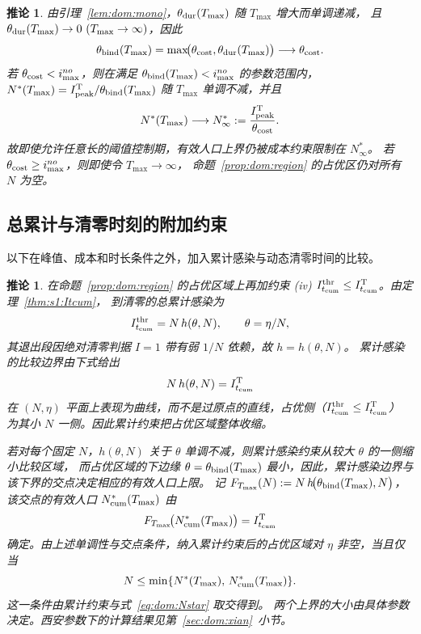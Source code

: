 \documentclass[lang=cn,a4paper,newtx]{elegantpaper}
\numberwithin{equation}{section}
\theoremstyle{plain}
\newtheorem{corollaryn}[theorem]{推论}
\newcommand{\Itcum}{I_{t_{\mathrm{cum}}}}
\begin{document}
\begin{corollaryn}\label{cor:ceiling}
由引理~\ref{lem:dom:mono}，$\theta_{\rm dur}(T_{\max})$ 随 $T_{\max}$ 增大而单调递减，
且 $\theta_{\rm dur}(T_{\max})\to0\ (T_{\max}\to\infty)$，因此
\[
  \theta_{\rm bind}(T_{\max})
  =
  \max\!\bigl(
    \theta_{\rm cost},
    \theta_{\rm dur}(T_{\max})
  \bigr)
  \longrightarrow
  \theta_{\rm cost}.
\]
若 $\theta_{\rm cost}<i_{\max}^{no}$，则在满足 $\theta_{\rm bind}(T_{\max})<i_{\max}^{no}$
的参数范围内，$N^\ast(T_{\max})=I_{\rm peak}^{\rm T}/\theta_{\rm bind}(T_{\max})$
随 $T_{\max}$ 单调不减，并且
\[
  N^\ast(T_{\max})
  \longrightarrow
  N^\ast_\infty
  :=
  \frac{I_{\rm peak}^{\rm T}}
       {\theta_{\rm cost}}.
\]
故即使允许任意长的阈值控制期，有效人口上界仍被成本约束限制在 $N^\ast_\infty$。
若 $\theta_{\rm cost}\ge i_{\max}^{no}$，则即使令 $T_{\max}\to\infty$，
命题~\ref{prop:dom:region} 的占优区仍对所有 $N$ 为空。
\end{corollaryn}

\subsection{总累计与清零时刻的附加约束}
\label{sec:dom:extensive}

以下在峰值、成本和时长条件之外，加入累计感染与动态清零时间的比较。

\begin{corollaryn}\label{cor:cum}
在命题~\ref{prop:dom:region} 的占优区域上再加约束
(iv) $\Itcum^{\rm thr}\le\Itcum^{\rm T}$。由定理~\ref{thm:s1:Itcum}，
到清零的总累计感染为
\[
  \Itcum^{\rm thr}=N\,h(\theta,N),\qquad \theta=\eta/N,
\]
其退出段因绝对清零判据 $I=1$ 带有弱 $1/N$ 依赖，故 $h=h(\theta,N)$。
累计感染的比较边界由下式给出
\begin{equation}
  N\,h(\theta,N)=\Itcum^{\rm T}
  \label{eq:dom:cum-feasible}
\end{equation}
在 $(N,\eta)$ 平面上表现为曲线，而不是过原点的直线，占优侧（$\Itcum^{\rm thr}\le\Itcum^{\rm T}$）
为其小 $N$ 一侧。因此累计约束把占优区域整体收缩。

若对每个固定 $N$，$h(\theta,N)$ 关于 $\theta$ 单调不减，则累计感染约束从较大 $\theta$ 的一侧缩小比较区域，
而占优区域的下边缘 $\theta=\theta_{\rm bind}(T_{\max})$ 最小，因此，累计感染边界与该下界的交点决定相应的有效人口上限。
记 $F_{T_{\max}}(N):=N\,h\!\bigl(\theta_{\rm bind}(T_{\max}),N\bigr)$，该交点的有效人口
$N_{\rm cum}^\ast(T_{\max})$ 由
\begin{equation}
  F_{T_{\max}}\!\bigl(N_{\rm cum}^\ast(T_{\max})\bigr)=\Itcum^{\rm T}
  \label{eq:dom:Ncumstar}
\end{equation}
确定。由上述单调性与交点条件，纳入累计约束后的占优区域对 $\eta$ 非空，当且仅当
\[
N\le\min\{N^\ast(T_{\max}),\,N_{\rm cum}^\ast(T_{\max})\}.
\]
这一条件由累计约束与式~\eqref{eq:dom:Nstar} 取交得到。
两个上界的大小由具体参数决定。西安参数下的计算结果见第~\ref{sec:dom:xian}~小节。
\end{corollaryn}
\end{document}
